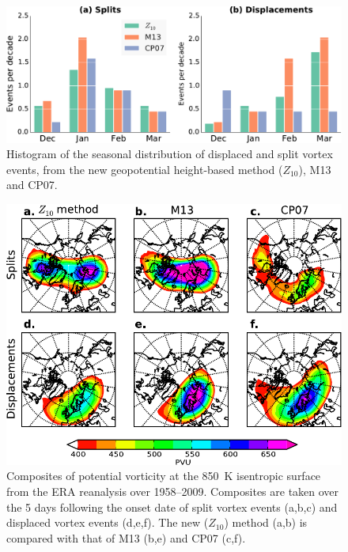 \begin{figure}
  \centering
  \noindent\includegraphics[width=\textwidth]{figures/chapter-moments/splits_displacements_histogram.pdf}
  \caption[Seasonal distribution of displaced and split vortex
  events.]{Histogram of the seasonal distribution of displaced and split vortex
    events, from the new geopotential height-based method ($Z_{10}$), M13 and
    CP07.}
  \label{fig:z_m13_cp07_histogram}
\end{figure}

\begin{figure}
 \centering
 \noindent\includegraphics[width=\textwidth]{figures/chapter-moments/pv_composites_colbar_crop.pdf}
 \caption[PV composites for split and displaced vortex events.]{Composites of
   potential vorticity at the 850~K isentropic surface from the ERA reanalysis
   over 1958--2009. Composites are taken over the 5 days following the onset date
   of split vortex events (a,b,c) and displaced vortex events (d,e,f). The
   new ($Z_{10}$) method (a,b) is compared with that of M13 (b,e) and CP07
   (c,f).}
 \label{fig:pv_composites_m13_cp07}
\end{figure}

